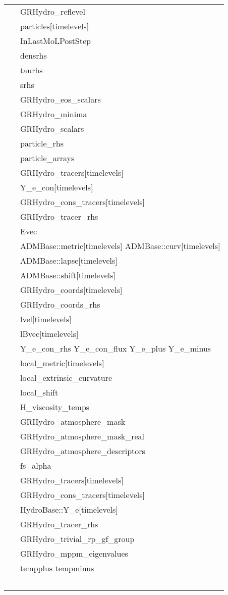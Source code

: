 \documentclass{article}
\begin{document}
\begin{tabular*}{160mm}{ll}
~ &  GRHydro\_reflevel\\ 
~ &  particles[timelevels]\\ 
~ &  InLastMoLPostStep\\ 
~ &  densrhs\\ 
~ &  taurhs\\ 
~ &  srhs\\ 
~ &  GRHydro\_eos\_scalars\\ 
~ &  GRHydro\_minima\\ 
~ &  GRHydro\_scalars\\ 
~ &  particle\_rhs\\ 
~ &  particle\_arrays\\ 
~ &  GRHydro\_tracers[timelevels]\\ 
~ &  Y\_e\_con[timelevels]\\ 
~ &  GRHydro\_cons\_tracers[timelevels]\\ 
~ &  GRHydro\_tracer\_rhs\\ 
~ &  Evec\\ 
~ &  ADMBase::metric[timelevels] ADMBase::curv[timelevels]\\ 
~ &  ADMBase::lapse[timelevels]\\ 
~ &  ADMBase::shift[timelevels]\\ 
~ &  GRHydro\_coords[timelevels]\\ 
~ &  GRHydro\_coords\_rhs\\ 
~ &  lvel[timelevels]\\ 
~ &  lBvec[timelevels]\\ 
~ &  Y\_e\_con\_rhs Y\_e\_con\_flux Y\_e\_plus Y\_e\_minus\\ 
~ &  local\_metric[timelevels]\\ 
~ &  local\_extrinsic\_curvature\\ 
~ &  local\_shift\\ 
~ &  H\_viscosity\_temps\\ 
~ &  GRHydro\_atmosphere\_mask\\ 
~ &  GRHydro\_atmosphere\_mask\_real\\ 
~ &  GRHydro\_atmosphere\_descriptors\\ 
~ &  fs\_alpha\\ 
~ &  GRHydro\_tracers[timelevels]\\ 
~ &  GRHydro\_cons\_tracers[timelevels]\\ 
~ &  HydroBase::Y\_e[timelevels]\\ 
~ &  GRHydro\_tracer\_rhs\\ 
~ &  GRHydro\_trivial\_rp\_gf\_group\\ 
~ &  GRHydro\_mppm\_eigenvalues\\ 
~ &  tempplus tempminus\\ 
~ & ~\\ 
\end{tabular*} 
\end{document}
